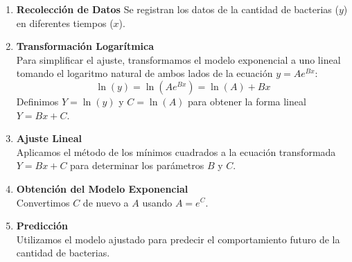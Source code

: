\begin{enumerate}
\item \textbf{Recolección de Datos}
Se registran los datos de la cantidad de bacterias (\( y \)) en diferentes tiempos (\( x \)).

\newpage

\item \textbf{Transformación Logarítmica}\\
Para simplificar el ajuste, transformamos el modelo exponencial a uno lineal tomando el logaritmo natural de ambos lados de la ecuación \( y = Ae^{Bx} \):
\[
\ln(y) = \ln(Ae^{Bx}) = \ln(A) + Bx
\]
Definimos \( Y = \ln(y) \) y \( C = \ln(A) \) para obtener la forma lineal \( Y = Bx + C \).

\item \textbf{Ajuste Lineal}\\
Aplicamos el método de los mínimos cuadrados a la ecuación transformada \( Y = Bx + C \) para determinar los parámetros \( B \) y \( C \).

\item \textbf{Obtención del Modelo Exponencial}\\
Convertimos \( C \) de nuevo a \( A \) usando \( A = e^C \).

\item \textbf{Predicción}\\
Utilizamos el modelo ajustado para predecir el comportamiento futuro de la cantidad de bacterias.
\end{enumerate}


